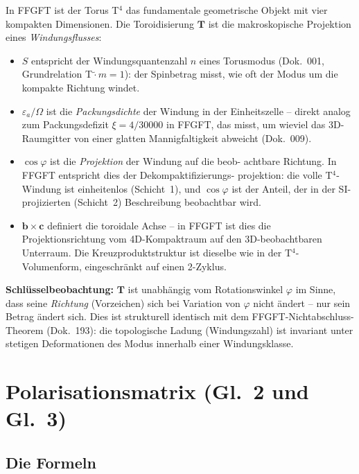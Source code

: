 In FFGFT ist der Torus T$^4$ das fundamentale geometrische Objekt mit vier
kompakten Dimensionen. Die Toroidisierung $\mathbf{T}$ ist die makroskopische
Projektion eines \emph{Windungsflusses}:
\begin{itemize}
  \item $S$ entspricht der Windungsquantenzahl $n$ eines Torusmodus
        (Dok.~001, Grundrelation T$\tilde{\cdot}m=1$): der Spinbetrag misst,
        wie oft der Modus um die kompakte Richtung windet.
  \item $\varepsilon_a/\Omega$ ist die \emph{Packungsdichte} der Windung
        in der Einheitszelle -- direkt analog zum Packungsdefizit
        $\xi = 4/30000$ in FFGFT, das misst, um wieviel das 3D-Raumgitter
        von einer glatten Mannigfaltigkeit abweicht (Dok.~009).
  \item $\cos\varphi$ ist die \emph{Projektion} der Windung auf die beob-
        achtbare Richtung. In FFGFT entspricht dies der Dekompaktifizierungs-
        projektion: die volle T$^4$-Windung ist einheitenlos (Schicht~1),
        und $\cos\varphi$ ist der Anteil, der in der SI-projizierten
        (Schicht~2) Beschreibung beobachtbar wird.
  \item $\mathbf{b}\times\mathbf{c}$ definiert die toroidale Achse -- in
        FFGFT ist dies die Projektionsrichtung vom 4D-Kompaktraum auf den
        3D-beobachtbaren Unterraum. Die Kreuzproduktstruktur ist dieselbe
        wie in der T$^4$-Volumenform, eingeschränkt auf einen 2-Zyklus.
\end{itemize}

\noindent\textbf{Schlüsselbeobachtung:} $\mathbf{T}$ ist unabhängig vom
Rotationswinkel $\varphi$ im Sinne, dass seine \emph{Richtung} (Vorzeichen)
sich bei Variation von $\varphi$ nicht ändert -- nur sein Betrag ändert sich.
Dies ist strukturell identisch mit dem FFGFT-Nichtabschluss-Theorem
(Dok.~193): die topologische Ladung (Windungszahl) ist invariant unter
stetigen Deformationen des Modus innerhalb einer Windungsklasse.

\section{Polarisationsmatrix (Gl.~2 und Gl.~3)}

\subsection*{Die Formeln}

